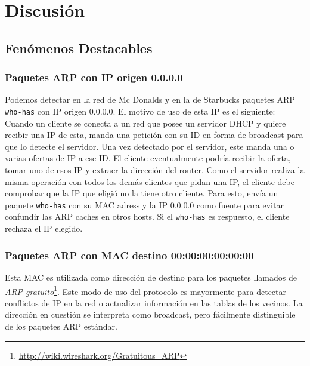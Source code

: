 \documentclass[a4paper, 10pt, twoside]{article}
\begin{document}


\section{Discusión}

\subsection{Fenómenos Destacables}

\subsubsection{Paquetes ARP con IP origen 0.0.0.0}

Podemos detectar en la red de Mc Donalds y en la de Starbucks paquetes ARP \texttt{who-has} con IP origen 0.0.0.0.
El motivo de uso de esta IP es el siguiente:
Cuando un cliente se conecta a un red que posee un servidor DHCP y quiere recibir una IP de esta, manda una petición con su ID en forma de broadcast para que lo detecte el servidor. Una vez detectado por el servidor, este manda una o varias ofertas de IP a ese ID.
El cliente eventualmente podría recibir la oferta, tomar uno de esos IP y extraer la dirección del router.
Como el servidor realiza la misma operación con todos los demás clientes que pidan una IP, el cliente debe comprobar que la IP que eligió no la tiene otro cliente. Para esto, envía un paquete \texttt{who-has} con su MAC adress y la IP 0.0.0.0 como fuente para evitar confundir las ARP caches en otros hosts. Si el \texttt{who-has} es respuesto, el cliente rechaza el IP elegido.



\subsubsection{Paquetes ARP con MAC destino 00:00:00:00:00:00}

Esta MAC es utilizada como dirección de destino para los paquetes llamados de \textit{ARP gratuito}\footnote{\url{http://wiki.wireshark.org/Gratuitous_ARP}}. Este modo de uso del protocolo es mayormente para detectar conflictos de IP en la red o actualizar información en las tablas de los vecinos. La dirección en cuestión se interpreta como broadcast, pero fácilmente distinguible de los paquetes ARP estándar.
\end{document}
